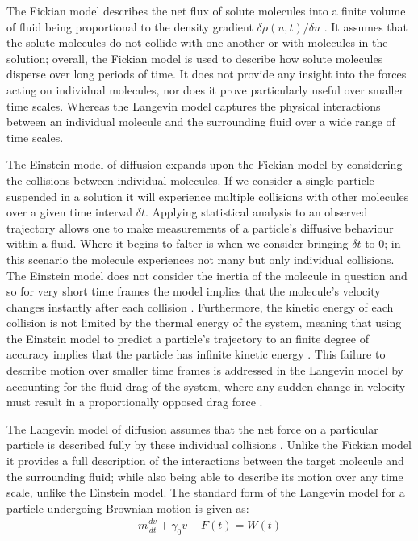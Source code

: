 The Fickian model describes the net flux of solute molecules 
into a finite volume of fluid being proportional to the 
density gradient $\delta\rho(u,t)/\delta u$ \cite{Gillespie2012}. 
It assumes that the solute molecules do not collide with one 
another or with molecules in the solution; overall, the Fickian 
model is used to describe how solute molecules disperse over 
long periods of time. It does not provide any insight into 
the forces acting on individual molecules, nor does it prove 
particularly useful over smaller time scales. Whereas the Langevin 
model captures the physical interactions between an individual 
molecule and the surrounding fluid over a wide range of time 
scales.

The Einstein model of diffusion expands upon the Fickian model 
by considering the collisions between individual molecules. If 
we consider a single particle suspended in a solution it will 
experience multiple collisions with other molecules 
\cite{Gillespie2012a} over a given time interval $\delta t$. 
Applying statistical analysis to an observed trajectory allows
one to make measurements of a particle's diffusive behaviour 
within a fluid. Where it begins to falter is when we consider 
bringing $\delta t$ to $0$; in this scenario the molecule 
experiences not many but only individual collisions. The 
Einstein model does not consider the inertia of the molecule 
in question and so for very short time frames the model 
implies that the molecule's velocity changes instantly after 
each collision \cite{Gillespie2012a, Gillespie2012b}. 
Furthermore, the kinetic energy of each collision is not 
limited by the thermal energy of the system, meaning that 
using the Einstein model to predict a particle's trajectory 
to an finite degree of accuracy implies that the particle 
has infinite kinetic energy \cite{Gillespie2012b}. This 
failure to describe motion over smaller time frames is 
addressed in the Langevin model by accounting for the fluid 
drag of the system, where any sudden change in velocity must 
result in a proportionally opposed drag force \cite{Gillespie2012c}. 

The Langevin model of diffusion assumes that the net force on 
a particular particle is described fully by these individual 
collisions \cite{Gillespie2012c}. Unlike the Fickian model it 
provides a full description of the interactions between the 
target molecule and the surrounding fluid; while also being 
able to describe its motion over any time scale, unlike the 
Einstein model. The standard form of the Langevin model for 
a particle undergoing Brownian motion is given as:
\begin{align}
	m\frac{dv}{dt} + \gamma_0 v + F(t) = W(t)
\end{align}

